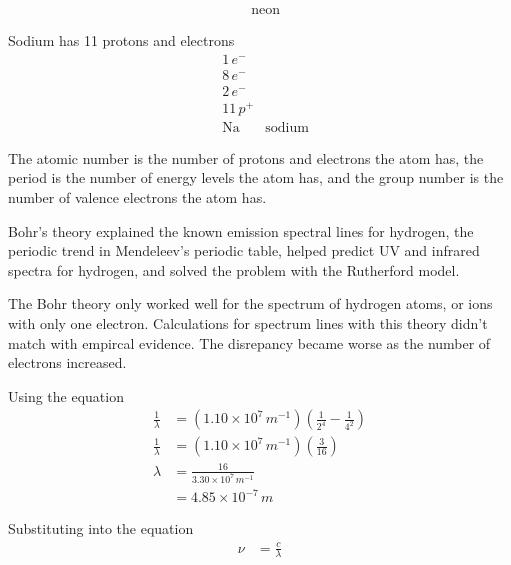 \begin{solutions}
\begin{enum-alph}
\begin{align*}
                    &\text{neon}
                \end{align*}
            \item Sodium has 11 protons and electrons
                \begin{align*}
                    &1\,\si{e^-}\\
                    &8\,\si{e^-}\\
                    &2\,\si{e^-}\\
                    &11\,\si{p^+}\\
                    &\text{Na}
                    &\text{sodium}
                \end{align*}
        \end{enum-alph}
    \item The atomic number is the number of protons and electrons the atom has, the period
        is the number of energy levels the atom has, and the group number is the number of
        valence electrons the atom has.
    \item Bohr's theory explained the known emission spectral lines for hydrogen, the periodic trend 
        in Mendeleev's periodic table, helped predict UV and infrared spectra for hydrogen, and solved 
        the problem with the Rutherford model.
    \item The Bohr theory only worked well for the spectrum of hydrogen atoms, or ions with only
        one electron. Calculations for spectrum lines with this theory didn't match with empircal
        evidence. The disrepancy became worse as the number of electrons increased.
    \item 
        \begin{enum-alph}
            \item Using the equation
                \begin{align*}
                    \frac{1}{\lambda}&=(1.10\times10^7\,\si{m^{-1}})\left(\frac{1}{2^4}-\frac{1}{4^2}\right)\\
                    \frac{1}{\lambda}&=(1.10\times10^7\,\si{m^{-1}})\left(\frac{3}{16}\right)\\
                    \lambda&=\frac{16}{3.30\times10^7\,\si{m^{-1}}}\\
                           &=4.85\times10^{-7}\,\si{m}
                \end{align*}
            \item Substituting into the equation
                \begin{align*}
                    \nu&=\frac{c}{\lambda}\\

\end{align*}
\end{enum-alph}
\end{solutions}
